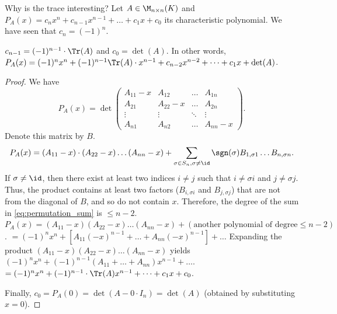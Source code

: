 Why is the trace interesting?
Let $A \in \M_{n \times n}(K)$ and $P_A(x) = c_n x^n + c_{n-1} x^{n-1} + \dots + c_1 x + c_0$ its characteristic polynomial. We have seen that $c_n = (-1)^n$.

\begin{lemma}\label{lem:char_poly_coeffs}
  $c_{n-1} = (-1)^{n-1} \cdot \Tr(A)$ and $c_0 = \det(A)$. In other words, $P_A(x) = (-1)^n x^n + (-1)^{n-1}\Tr(A) \cdot x^{n-1} + c_{n-2}x^{n-2} + \dots + c_1 x + \det(A)$.
\end{lemma}

\begin{proof}
  We have
  \[
  P_A(x) = \det\begin{pmatrix} A_{11}-x & A_{12} & \dots & A_{1n} \\ A_{21} & A_{22}-x & \dots & A_{2n} \\ \vdots & \vdots & \ddots & \vdots \\ A_{n1} & A_{n2} & \dots & A_{nn}-x \end{pmatrix}.
  \]
  Denote this matrix by $B$.
  \begin{equation} \label{eq:permutation_sum}
    P_A(x) = (A_{11}-x) \cdot (A_{22}-x) \dots (A_{nn}-x) + \sum_{\sigma \in S_n, \sigma \ne \id} \sgn(\sigma) B_{1, \sigma 1} \dots B_{n, \sigma n}.
  \end{equation}
  If $\sigma \ne \id$, then there exist at least two indices $i \ne j$ such that $i \ne \sigma i$ and $j \ne \sigma j$.
  Thus, the product contains at least two factors ($B_{i, \sigma i}$ and $B_{j, \sigma j}$) that are not from the diagonal of $B$, and so do not contain $x$.
  Therefore, the degree of the sum in \eqref{eq:permutation_sum} is $\le n-2$.
  $P_A(x) = (A_{11}-x)(A_{22}-x) \dots (A_{nn}-x) + (\text{another polynomial of degree} \le n-2)$.
  $= (-1)^n x^n + \left[ A_{11}(-x)^{n-1} + \dots + A_{nn}(-x)^{n-1} \right] + \dots$
  Expanding the product $(A_{11}-x)(A_{22}-x) \dots (A_{nn}-x)$ yields $(-1)^n x^n + (-1)^{n-1}(A_{11} + \dots + A_{nn})x^{n-1} + \dots$.
  $= (-1)^n x^n + (-1)^{n-1} \cdot \Tr(A)x^{n-1} + \dots + c_1 x + c_0$.

  Finally, $c_0 = P_A(0) = \det(A - 0 \cdot I_n) = \det(A)$ (obtained by substituting $x=0$).
\end{proof}

